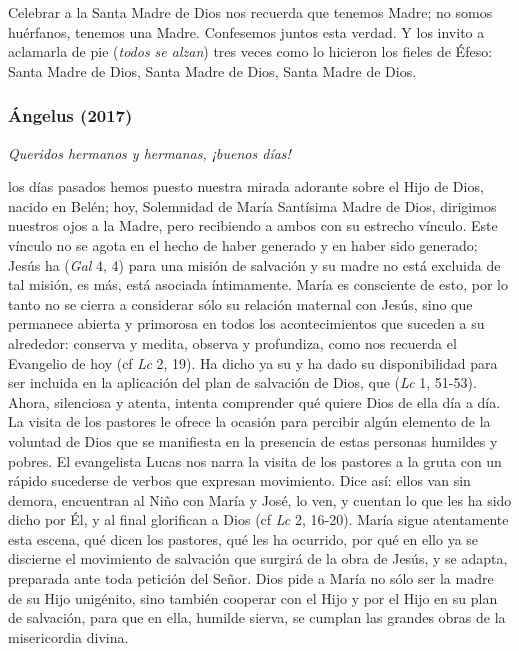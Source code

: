 \begin{body}
	Celebrar a la Santa Madre de Dios nos recuerda que tenemos Madre; no somos huérfanos, tenemos una Madre. Confesemos juntos esta verdad. Y los invito a aclamarla de pie (\emph{todos se alzan}) tres veces como lo hicieron los fieles de Éfeso: Santa Madre de Dios, Santa Madre de Dios, Santa Madre de Dios.
\end{body}

\subsubsection{Ángelus (2017)} 


\begin{body}
	\emph{Queridos hermanos y hermanas, ¡buenos días!}
	
	 los días pasados hemos puesto nuestra mirada adorante sobre el Hijo de Dios, nacido en Belén; hoy, Solemnidad de María Santísima Madre de Dios, dirigimos nuestros ojos a la Madre, pero recibiendo a ambos con su estrecho vínculo. Este vínculo no se agota en el hecho de haber generado y en haber sido generado; Jesús ha  (\emph{Gal} 4, 4) para una misión de salvación y su madre no está excluida de tal misión, es más, está asociada íntimamente. María es consciente de esto, por lo tanto no se cierra a considerar sólo su relación maternal con Jesús, sino que permanece abierta y primorosa en todos los acontecimientos que suceden a su alrededor: conserva y medita, observa y profundiza, como nos recuerda el Evangelio de hoy (cf \emph{Lc} 2, 19). Ha dicho ya su  y ha dado su disponibilidad para ser incluida en la aplicación del plan de salvación de Dios, que  (\emph{Lc} 1, 51-53). Ahora, silenciosa y atenta, intenta comprender qué quiere Dios de ella día a día. La visita de los pastores le ofrece la ocasión para percibir algún elemento de la voluntad de Dios que se manifiesta en la presencia de estas personas humildes y pobres. El evangelista Lucas nos narra la visita de los pastores a la gruta con un rápido sucederse de verbos que expresan movimiento. Dice así: ellos van sin demora, encuentran al Niño con María y José, lo ven, y cuentan lo que les ha sido dicho por Él, y al final glorifican a Dios (cf \emph{Lc} 2, 16-20). María sigue atentamente esta escena, qué dicen los pastores, qué les ha ocurrido, por qué en ello ya se discierne el movimiento de salvación que surgirá de la obra de Jesús, y se adapta, preparada ante toda petición del Señor. Dios pide a María no sólo ser la madre de su Hijo unigénito, sino también cooperar con el Hijo y por el Hijo en su plan de salvación, para que en ella, humilde sierva, se cumplan las grandes obras de la misericordia divina.
	

\end{body}
